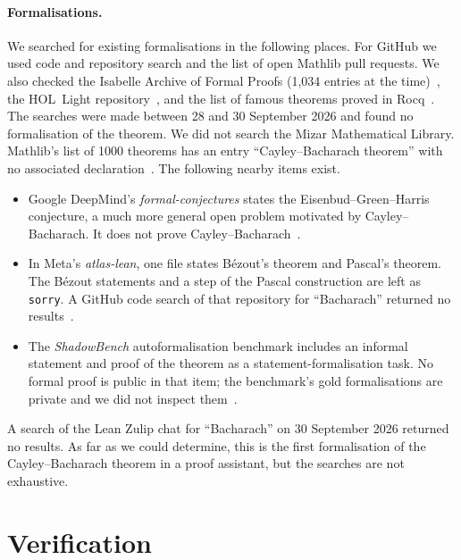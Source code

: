 \documentclass[11pt]{article}
\theoremstyle{definition}
\theoremstyle{remark}
\newcommand{\lean}[1]{\texttt{#1}}
\begin{document}
\paragraph{Formalisations.} We searched for existing formalisations in the following places. For
GitHub we used code and repository search and the list of open Mathlib pull requests. We also
checked the Isabelle Archive of Formal Proofs (1{,}034 entries at the time)~\cite{AFP}, the HOL~Light
repository~\cite{HOLLight}, and the list of famous theorems proved in Rocq~\cite{Rocq100}. The
searches were made between 28 and 30 September 2026 and found no formalisation of the theorem.
We did not search the Mizar Mathematical Library.
Mathlib's list of 1000 theorems has an entry ``Cayley--Bacharach theorem'' with no associated
declaration~\cite{Mathlib1000}. The following nearby items exist.
\begin{itemize}
\item Google DeepMind's \emph{formal-conjectures} states the Eisenbud--Green--Harris conjecture,
a much more general open problem motivated by Cayley--Bacharach. It does not prove
Cayley--Bacharach~\cite{FormalConjectures}.
\item In Meta's \emph{atlas-lean}, one file states B\'ezout's theorem and Pascal's theorem. The
B\'ezout statements and a step of the Pascal construction are left as \lean{sorry}. A GitHub code search of
that repository for ``Bacharach'' returned no results~\cite{AtlasLean}.
\item The \emph{ShadowBench} autoformalisation benchmark includes an informal statement and proof of
the theorem as a statement-formalisation task. No formal proof is public in that item; the benchmark's gold
formalisations are private and we did not inspect them~\cite{ShadowBench}.
\end{itemize}
A search of the Lean Zulip chat for ``Bacharach'' on 30 September 2026 returned no results. As far as we could determine, this is the first
formalisation of the Cayley--Bacharach theorem in a proof assistant, but the searches are not
exhaustive.

\section{Verification}\label{sec:gate}
\end{document}
